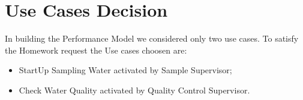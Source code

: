 \chapter{\textbf{Use Cases Decision}}

In building the Performance Model we considered only two use cases. To satisfy the Homework request the Use cases choosen are:
\begin{itemize}
	\item StartUp Sampling Water activated by Sample Supervisor;
	\item Check Water Quality activated by Quality Control Supervisor.
\end{itemize}
